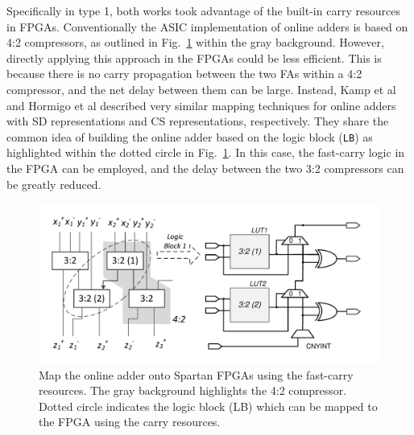 \documentclass[conference]{IEEEtran}
\begin{document}
Specifically in type 1, both works took advantage of the built-in carry resources in FPGAs. Conventionally the ASIC implementation of online adders is based on 4:2 compressors, as outlined in Fig.~\ref{Fig:PreviousWork} within the gray background. However, directly applying this approach in the FPGAs could be less efficient. This is because there is no carry propagation between the two FAs within a 4:2 compressor, and the net delay between them can be large. Instead, Kamp et al \cite{FPT09RA} and Hormigo et al \cite{ASAP09RA} described very similar mapping techniques for online adders with SD representations and CS representations, respectively. They share the common idea of building the online adder based on the logic block (\texttt{LB}) as highlighted within the dotted circle in Fig.~\ref{Fig:PreviousWork}. In this case, the fast-carry logic in the FPGA can be employed, and the delay between the two 3:2 compressors can be greatly reduced.
%
\begin{figure}[tbp]
	\centering
	\includegraphics[width=.5\textwidth]{./Figures/SDAdder_42comp_Spartan2.pdf}
	\vspace{-4ex}
	\caption{Map the online adder onto Spartan FPGAs using the fast-carry resources. The gray background highlights the 4:2 compressor. Dotted circle indicates the logic block (LB) which can be mapped to the FPGA using the carry resources.}
	\vspace{-4ex}
	\label{Fig:PreviousWork}
\end{figure}
\end{document}
